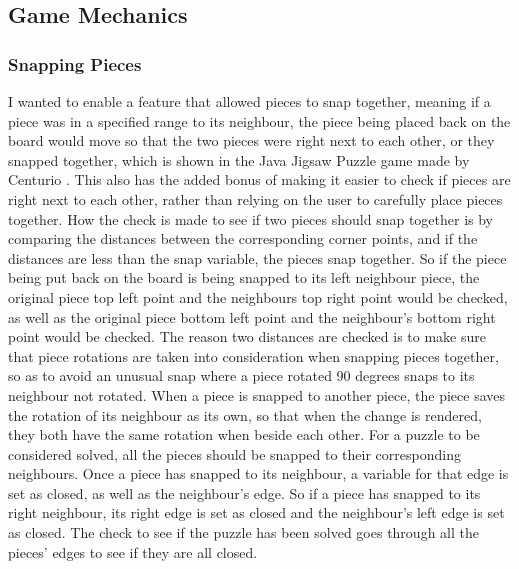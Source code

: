\documentclass{article}
\begin{document}
\subsection{Game Mechanics}

\subsubsection{Snapping Pieces}
I wanted to enable a feature that allowed pieces to snap together, meaning if a piece was in a specified range to its neighbour, the piece being placed back on the board would move so that the two pieces were right next to each other, or they snapped together, which is shown in the Java Jigsaw Puzzle game made by Centurio \cite{ref:SourceJigsaw}. This also has the added bonus of making it easier to check if pieces are right next to each other, rather than relying on the user to carefully place pieces together. How the check is made to see if two pieces should snap together is by comparing the distances between the corresponding corner points, and if the distances are less than the snap variable, the pieces snap together. So if the piece being put back on the board is being snapped to its left neighbour piece, the original piece top left point and the neighbours top right point would be checked, as well as the original piece bottom left point and the neighbour's bottom right point would be checked. The reason two distances are checked is to make sure that piece rotations are taken into consideration when snapping pieces together, so as to avoid an unusual snap where a piece rotated 90 degrees snaps to its neighbour not rotated. When a piece is snapped to another piece, the piece saves the rotation of its neighbour as its own, so that when the change is rendered, they both have the same rotation when beside each other. For a puzzle to be considered solved, all the pieces should be snapped to their corresponding neighbours. Once a piece has snapped to its neighbour, a variable for that edge is set as closed, as well as the neighbour's edge. So if a piece has snapped to its right neighbour, its right edge is set as closed and the neighbour's left edge is set as closed. The check to see if the puzzle has been solved goes through all the pieces' edges to see if they are all closed.
\end{document}
